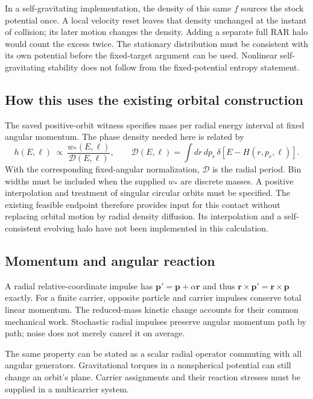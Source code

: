 \documentclass[11pt]{article}
\begin{document}
In a self-gravitating implementation, the density of this same $f$ sources
the stock potential once. A local velocity reset leaves that density
unchanged at the instant of collision; its later motion changes the density.
Adding a separate full RAR halo would count the excess twice. The stationary
distribution must be consistent with its own potential before the fixed-target
argument can be used. Nonlinear self-gravitating stability does not follow
from the fixed-potential entropy statement.

\subsection{How this uses the existing orbital construction}
The saved positive-orbit witness specifies mass per radial energy interval
at fixed angular momentum. The phase density needed here is related by
\begin{equation}
 h(E,\ell)\ \propto\
 \frac{w_*(E,\ell)}{\mathcal D(E,\ell)},
 \qquad
 \mathcal D(E,\ell)=\int dr\,dp_r\,
       \delta[E-H(r,p_r,\ell)].
\end{equation}
With the corresponding fixed-angular normalization, $\mathcal D$ is the
radial period. Bin widths must be included when the supplied $w_*$ are
discrete masses. A positive interpolation and treatment of singular circular
orbits must be specified. The existing feasible endpoint therefore provides
input for this contact without replacing orbital motion by radial density
diffusion. Its interpolation and a self-consistent evolving halo have not
been implemented in this calculation.

\subsection{Momentum and angular reaction}
A radial relative-coordinate impulse has
$\mathbf p' =\mathbf p+\alpha\mathbf r$ and thus
$\mathbf r\times\mathbf p'=\mathbf r\times\mathbf p$ exactly.
For a finite carrier, opposite particle and carrier impulses conserve total
linear momentum. The reduced-mass kinetic change accounts for their common
mechanical work. Stochastic radial impulses preserve angular momentum
path by path; noise does not merely cancel it on average.

The same property can be stated as a scalar radial operator commuting with
all angular generators. Gravitational torques in a nonspherical potential
can still change an orbit's plane. Carrier assignments and their reaction
stresses must be supplied in a multicarrier system.
\end{document}
